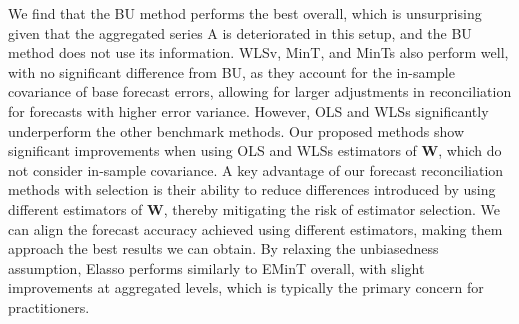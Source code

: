 \documentclass[
  11pt]{article}
\theoremstyle{plain}
\theoremstyle{remark}
\begin{document}
We find that the BU method performs the best overall, which is
unsurprising given that the aggregated series A is deteriorated in this
setup, and the BU method does not use its information. WLSv, MinT, and
MinTs also perform well, with no significant difference from BU, as they
account for the in-sample covariance of base forecast errors, allowing
for larger adjustments in reconciliation for forecasts with higher error
variance. However, OLS and WLSs significantly underperform the other
benchmark methods. Our proposed methods show significant improvements
when using OLS and WLSs estimators of \(\bm{W}\), which do not consider
in-sample covariance. A key advantage of our forecast reconciliation
methods with selection is their ability to reduce differences introduced
by using different estimators of \(\bm{W}\), thereby mitigating the risk
of estimator selection. We can align the forecast accuracy achieved
using different estimators, making them approach the best results we can
obtain. By relaxing the unbiasedness assumption, Elasso performs
similarly to EMinT overall, with slight improvements at aggregated
levels, which is typically the primary concern for practitioners.
\end{document}
